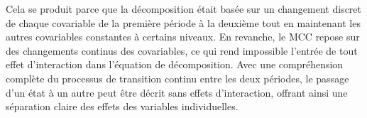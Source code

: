 Cela se produit parce que la décomposition était basée sur un changement discret de chaque covariable de la première période à la deuxième tout en maintenant les autres covariables constantes à certains niveaux. En revanche, le MCC repose sur des changements continus des covariables, ce qui rend impossible l'entrée de tout effet d'interaction dans l'équation de décomposition. Avec une compréhension complète du processus de transition continu entre les deux périodes, le passage d'un état à un autre peut être décrit sans effets d'interaction, offrant ainsi une séparation claire des effets des variables individuelles.